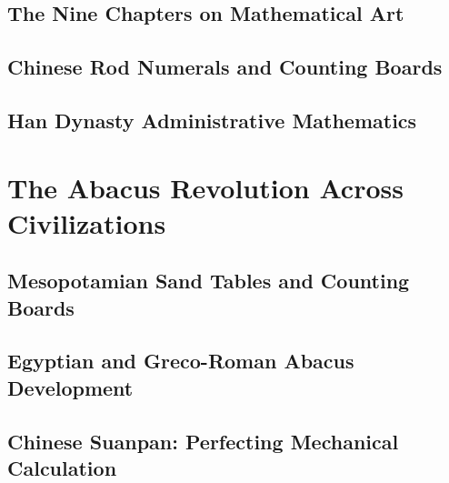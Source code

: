 \documentclass[12pt, oneside, openany]{book}
\begin{document}
\section{The Nine Chapters on Mathematical Art}

\section{Chinese Rod Numerals and Counting Boards}

\section{Han Dynasty Administrative Mathematics}


\chapter{The Abacus Revolution Across Civilizations}

\section{Mesopotamian Sand Tables and Counting Boards}

\section{Egyptian and Greco-Roman Abacus Development}

\section{Chinese Suanpan: Perfecting Mechanical Calculation}
\end{document}
